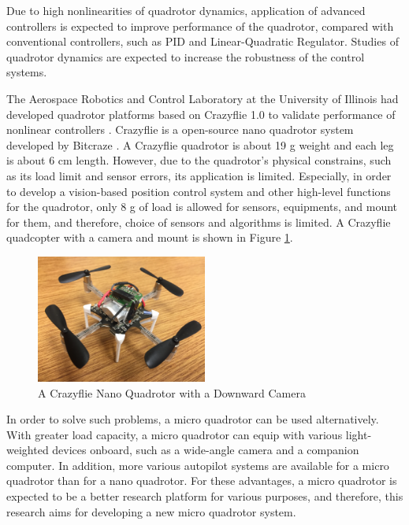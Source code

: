 Due to high nonlinearities of quadrotor dynamics, application of advanced controllers is expected to improve performance of the quadrotor, compared with conventional controllers, such as PID and Linear-Quadratic Regulator. Studies of quadrotor dynamics are expected to increase the robustness of the control systems.

The Aerospace Robotics and Control Laboratory at the University of Illinois had developed quadrotor platforms based on Crazyflie 1.0 to validate performance of nonlinear controllers \cite{Morgan16}.  %
Crazyflie is a open-source nano quadrotor system developed by Bitcraze \cite{bitcraze}. %
A Crazyflie quadrotor is about 19 g weight and each leg is about 6 cm length. However, due to the quadrotor's physical constrains, such as its load limit and sensor errors, its application is limited. Especially, in order to develop a vision-based position control system and other high-level functions for the quadrotor, only 8 g of load is allowed for sensors, equipments, and mount for them, and therefore, choice of sensors and algorithms is limited. A Crazyflie quadcopter with a camera and mount is shown in Figure \ref{fig:crazyflie}.

\begin{figure}
    \centering
    \includegraphics[width=0.5\textwidth]{graphics/crazyflie.jpg}
    \caption{A Crazyflie Nano Quadrotor with a Downward Camera}
    \label{fig:crazyflie}
\end{figure}

In order to solve such problems, a micro quadrotor can be used alternatively. With greater load capacity, a micro quadrotor can equip with various light-weighted devices onboard, such as a wide-angle camera and a companion computer. In addition, more various autopilot systems are available for a micro quadrotor than for a nano quadrotor. For these advantages, a micro quadrotor is expected to be a better research platform for various purposes, and therefore, this research aims for developing a new micro quadrotor system.

